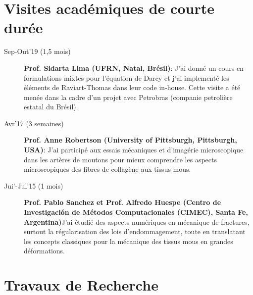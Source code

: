 \documentclass[french]{article}
\begin{document}
\begin{description}
\end{description}

\section*{Visites académiques de courte durée}

\begin{description}
\item[Sep-Out'19 (1,5 mois)] \textbf{Prof. Sidarta Lima (UFRN, Natal, Brésil)}: J'ai donné un cours en formulations mixtes pour l'équation de Darcy et j'ai implementé les éléments de Raviart-Thomas dans leur code in-house. Cette visite a été menée dans la cadre d'un projet avec Petrobras (companie petrolière estatal du Brésil).
\item[Avr'17 (3 semaines)] \textbf{Prof. Anne Robertson (University of Pittsburgh, Pittsburgh, USA)}: J'ai participé aux essais mécaniques et d'imagérie microscopique dans les artères de moutons pour mieux comprendre les aspects microscopiques des fibres de collagène aux tissus mous.
\item[Jui'-Jul'15 (1 mois)] \textbf{Prof. Pablo Sanchez et Prof. Alfredo Huespe (Centro de Investigación de Métodos Computacionales (CIMEC), Santa Fe, Argentina)}{J'ai étudié des aspects numériques en mécanique de fractures, surtout la régularisation des lois d'endommagement, toute en translatant les concepts classiques pour la mécanique des tissus mous en grandes déformations.}
	
\end{description}



%

\section*{Travaux de Recherche} \label{sec:travaux}
\end{document}
